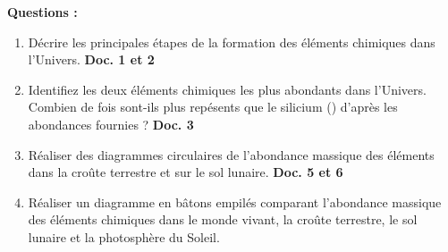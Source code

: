 \documentclass[a4paper,11pt,fleqn]{article}%
\begin{document}
\noindent\begin{minipage}{\linewidth}
    \textbf{Questions :}
        \begin{enumerate}
            \item Décrire les principales étapes de la formation des éléments chimiques dans l'Univers. \textcolor{gray!80!blue}{\textbf{Doc. 1 et 2}}
            \item Identifiez les deux éléments chimiques les plus abondants dans l'Univers. Combien de fois sont-ils plus repésents que le silicium () d'après les abondances fournies ? \textcolor{gray!80!blue}{\textbf{Doc. 3}}
            \item Réaliser des diagrammes circulaires de l'abondance massique des éléments dans la croûte terrestre et sur le sol lunaire. \textcolor{gray!80!blue}{\textbf{Doc. 5 et 6}}
            \item Réaliser un diagramme en bâtons empilés comparant l'abondance massique des éléments chimiques dans le monde vivant, la croûte terrestre, le sol lunaire et la photosphère du Soleil.
        \end{enumerate}
\end{minipage}
\end{document}
